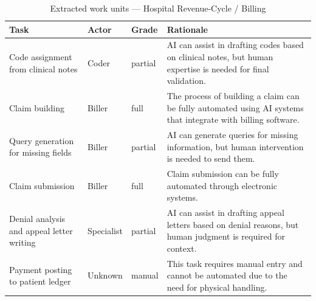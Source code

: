 \begin{table}[htbp]\centering
\small
\caption{Extracted work units — Hospital Revenue-Cycle / Billing}
\label{tab:units_hospital_billing}
\begin{tabular}{@{}llll@{}}
\toprule
Task & Actor & Grade & Rationale \\
\midrule
Code assignment from clinical notes & Coder & partial & AI can assist in drafting codes based on clinical notes, but human expertise is needed for final validation. \\
Claim building & Biller & full & The process of building a claim can be fully automated using AI systems that integrate with billing software. \\
Query generation for missing fields & Biller & partial & AI can generate queries for missing information, but human intervention is needed to send them. \\
Claim submission & Biller & full & Claim submission can be fully automated through electronic systems. \\
Denial analysis and appeal letter writing & Specialist & partial & AI can assist in drafting appeal letters based on denial reasons, but human judgment is required for context. \\
Payment posting to patient ledger & Unknown & manual & This task requires manual entry and cannot be automated due to the need for physical handling. \\
\bottomrule
\end{tabular}
\end{table}